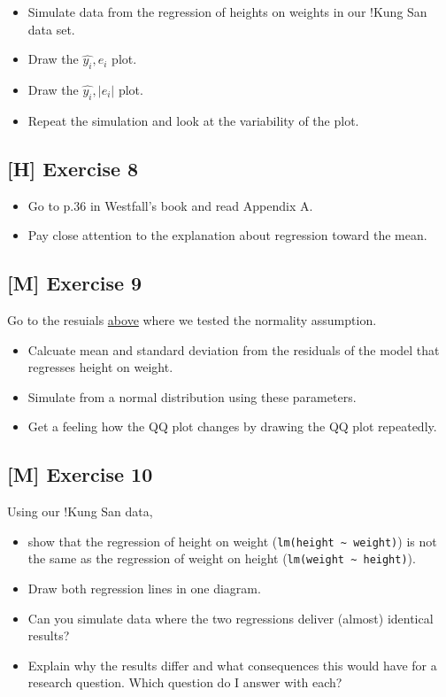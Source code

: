 \documentclass[
]{book}
\providecommand{\tightlist}{%
  \setlength{\itemsep}{0pt}\setlength{\parskip}{0pt}}
\begin{document}
\begin{itemize}
\tightlist
\item
  Simulate data from the regression of heights on weights in our !Kung San data set.
\item
  Draw the \(\hat{y_i}, e_i\) plot.
\item
  Draw the \(\hat{y_i}, |e_i|\) plot.
\item
  Repeat the simulation and look at the variability of the plot.
\end{itemize}

\subsection{{[}H{]} Exercise 8}\label{exercise8_simpl_lin_reg}

\begin{itemize}
\tightlist
\item
  Go to p.36 in Westfall's book and read Appendix A.
\item
  Pay close attention to the explanation about regression toward the mean.
\end{itemize}

\subsection{{[}M{]} Exercise 9}\label{exercise9_simpl_lin_reg}

Go to the resuials \hyperref[normality_assumption]{above} where we tested the normality assumption.

\begin{itemize}
\tightlist
\item
  Calcuate mean and standard deviation from the residuals of the model
  that regresses height on weight.
\item
  Simulate from a normal distribution using these parameters.
\item
  Get a feeling how the QQ plot changes by drawing the QQ plot repeatedly.
\end{itemize}

\subsection{{[}M{]} Exercise 10}\label{exercise10_simpl_lin_reg}

Using our !Kung San data,

\begin{itemize}
\tightlist
\item
  show that the regression of height on weight (\texttt{lm(height\ \textasciitilde{}\ weight)})
  is not the same as the regression of weight on height (\texttt{lm(weight\ \textasciitilde{}\ height)}).
\item
  Draw both regression lines in one diagram.
\item
  Can you simulate data where the two regressions deliver (almost) identical results?
\item
  Explain why the results differ and what consequences this would have for a research question.
  Which question do I answer with each?
\end{itemize}
\end{document}
